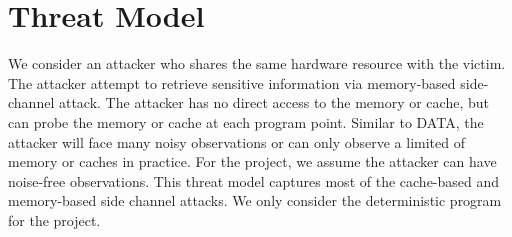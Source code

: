 \section{Threat Model}
We consider an attacker who shares the same hardware resource with the victim. 
The attacker attempt to retrieve sensitive information via memory-based side-channel attack. 
The attacker has no direct access to the memory or cache, but can probe the memory 
or cache at each program point. Similar to DATA, the attacker will face many 
noisy observations or can only observe a limited of memory or caches in practice. 
For the project, we assume the attacker can have noise-free observations. 
This threat model captures most of the cache-based and memory-based side channel attacks.
We only consider the deterministic program for the project.
